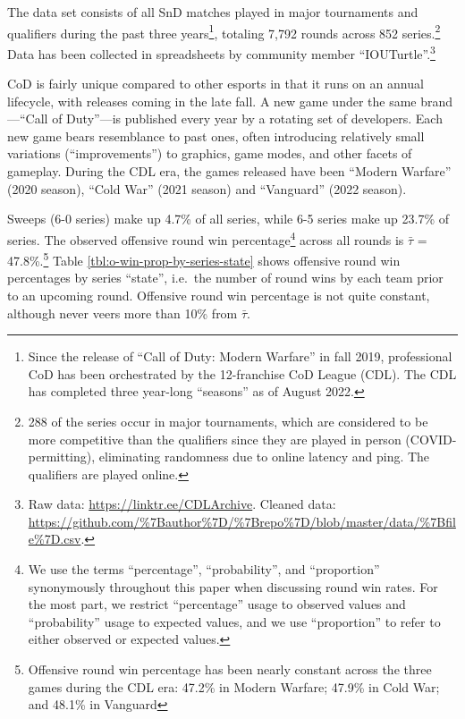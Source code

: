 \documentclass{article}
\begin{document}
The data set consists of all SnD matches played in major tournaments and
qualifiers during the past three years\footnote{Since the release of
  ``Call of Duty: Modern Warfare'' in fall 2019, professional CoD has
  been orchestrated by the 12-franchise CoD League (CDL). The CDL has
  completed three year-long ``seasons'' as of August 2022.}, totaling
7,792 rounds across 852 series.\footnote{288 of the series occur in
  major tournaments, which are considered to be more competitive than
  the qualifiers since they are played in person (COVID-permitting),
  eliminating randomness due to online latency and ping. The qualifiers
  are played online.} Data has been collected in spreadsheets by
community member ``IOUTurtle''.\footnote{Raw data:
  \url{https://linktr.ee/CDLArchive}. Cleaned data:
  \url{https://github.com/\%7Bauthor\%7D/\%7Brepo\%7D/blob/master/data/\%7Bfile\%7D.csv}.}

CoD is fairly unique compared to other esports in that it runs on an
annual lifecycle, with releases coming in the late fall. A new game
under the same brand---``Call of Duty''---is published every year by a
rotating set of developers. Each new game bears resemblance to past
ones, often introducing relatively small variations (``improvements'')
to graphics, game modes, and other facets of gameplay. During the CDL
era, the games released have been ``Modern Warfare'' (2020 season),
``Cold War'' (2021 season) and ``Vanguard'' (2022 season).

Sweeps (6-0 series) make up 4.7\% of all series, while 6-5 series make
up 23.7\% of series. The observed offensive round win
percentage\footnote{We use the terms ``percentage'', ``probability'',
  and ``proportion'' synonymously throughout this paper when discussing
  round win rates. For the most part, we restrict ``percentage'' usage
  to observed values and ``probability'' usage to expected values, and
  we use ``proportion'' to refer to either observed or expected values.}
across all rounds is \(\bar{\tau}\) = 47.8\%.\footnote{Offensive round
  win percentage has been nearly constant across the three games during
  the CDL era: 47.2\% in Modern Warfare; 47.9\% in Cold War; and 48.1\%
  in Vanguard} Table \ref{tbl:o-win-prop-by-series-state} shows
offensive round win percentages by series ``state'', i.e.~the number of
round wins by each team prior to an upcoming round. Offensive round win
percentage is not quite constant, although never veers more than 10\%
from \(\bar{\tau}\).
\end{document}
